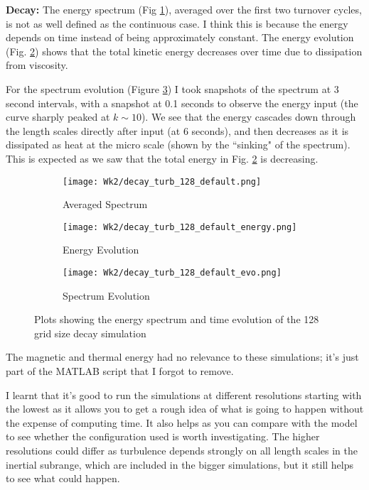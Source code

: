 \documentclass[12pt,letterpaper]{article}
\begin{document}
  \textbf{Decay:} The energy spectrum (Fig \ref{fig:128decayspec}), averaged over the first two turnover cycles, is not as well defined as the continuous case. I think this is because the energy depends on time instead of being approximately constant. The energy evolution (Fig. \ref{fig:128decayeng}) shows that the total kinetic energy decreases over time due to dissipation from viscosity.

  For the spectrum evolution (Figure \ref{fig:128decayevo}) I took snapshots of the spectrum at 3 second intervals, with a snapshot at 0.1 seconds to observe the energy input (the curve sharply peaked at $k \sim 10$). We see that the energy cascades down through the length scales directly after input (at 6 seconds), and then decreases as it is dissipated as heat at the micro scale (shown by the ``sinking" of the spectrum). This is expected as we saw that the total energy in Fig. \ref{fig:128decayeng} is decreasing.

  \begin{figure}[!h]

  \begin{subfigure}{0.2\linewidth}
  \centering
  \texttt{[image: Wk2/decay\_turb\_128\_default.png]}
  \caption{Averaged Spectrum}
  \label{fig:128decayspec}
  \end{subfigure}
  \hfill
  \begin{subfigure}{0.2\linewidth}
  \centering
  \texttt{[image: Wk2/decay\_turb\_128\_default\_energy.png]}
  \caption{Energy Evolution}
  \label{fig:128decayeng}
  \end{subfigure}
  \hfill
  \begin{subfigure}{0.2\linewidth}
  \centering
  \texttt{[image: Wk2/decay\_turb\_128\_default\_evo.png]}
  \caption{Spectrum Evolution}
  \label{fig:128decayevo}
  \end{subfigure}

  \caption{Plots showing the energy spectrum and time evolution of the 128 grid size decay simulation}
  \label{fig:128decayenergy}
  \end{figure}

  The magnetic and thermal energy had no relevance to these simulations; it's just part of the MATLAB script that I forgot to remove.

  I learnt that it's good to run the simulations at different resolutions starting with the lowest as it allows you to get a rough idea of what is going to happen without the expense of computing time. It also helps as you can compare with the model to see whether the configuration used is worth investigating. The higher resolutions could differ as turbulence depends strongly on all length scales in the inertial subrange, which are included in the bigger simulations, but it still helps to see what could happen.
\end{document}
